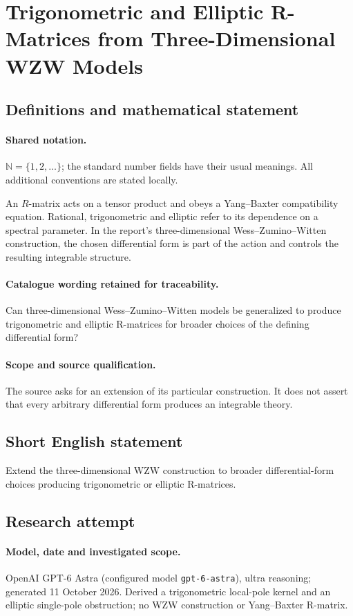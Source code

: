 \documentclass[11pt]{article}
\begin{document}
\section{Trigonometric and Elliptic R-Matrices from Three-Dimensional WZW Models}\label{statement}

\subsection{Definitions and mathematical statement}

\paragraph{Shared notation.}$\mathbb N=\{1,2,\ldots\}$; the standard number fields have their usual meanings. All additional conventions are stated locally.


An $R$-matrix acts on a tensor product and obeys a Yang--Baxter compatibility equation. Rational, trigonometric and elliptic refer to its dependence on a spectral parameter. In the report's three-dimensional Wess--Zumino--Witten construction, the chosen differential form is part of the action and controls the resulting integrable structure.

\paragraph{Catalogue wording retained for traceability.}
Can three-dimensional Wess–Zumino–Witten models be generalized to produce trigonometric and elliptic R-matrices for broader choices of the defining differential form?

\paragraph{Scope and source qualification.}The source asks for an extension of its particular construction. It does not assert that every arbitrary differential form produces an integrable theory.
\subsection{Short English statement}
Extend the three-dimensional WZW construction to broader differential-form choices producing trigonometric or elliptic R-matrices.
\subsection{Research attempt}
\paragraph{Model, date and investigated scope.}
OpenAI GPT-6 Astra (configured model \texttt{gpt-6-astra}), ultra reasoning; generated 11 October 2026. Derived a trigonometric local-pole kernel and an elliptic single-pole obstruction; no WZW construction or Yang–Baxter R-matrix.
\end{document}
